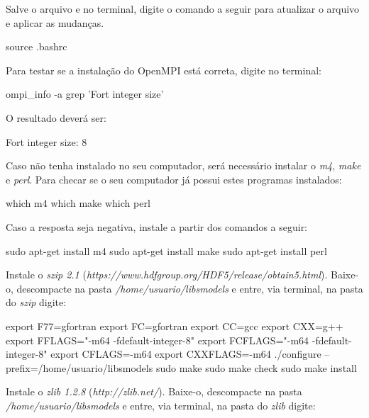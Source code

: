 \noindent Salve o arquivo e no terminal, digite o comando a seguir para atualizar o arquivo e aplicar as mudanças.
\bigskip

\begin{bashcode}
source .bashrc
\end{bashcode}
\bigskip

\noindent Para testar se a instalação do OpenMPI está correta, digite no terminal:
\bigskip

\begin{bashcode}
ompi_info -a grep 'Fort integer size'
\end{bashcode}
\bigskip

\noindent O resultado deverá ser:
\bigskip

\begin{bashcode}
Fort integer size: 8
\end{bashcode}
\bigskip

\noindent Caso não tenha instalado no seu computador, será necessário instalar o \textit{m4}, \textit{make} e \textit{perl}. Para checar se o seu computador já possui estes programas instalados:
\bigskip

\begin{bashcode}
which m4
which make
which perl
\end{bashcode}
\bigskip

\noindent Caso a resposta seja negativa, instale a partir dos comandos a seguir:
\bigskip

\begin{bashcode}
sudo apt-get install m4
sudo apt-get install make
sudo apt-get install perl
\end{bashcode}
\bigskip

\noindent Instale o \textit{szip 2.1} (\textcolor{bleu_cite}{\textit{https://www.hdfgroup.org/HDF5/release/obtain5.html}}). Baixe-o, descompacte na pasta \textit{/home/usuario/libsmodels} e entre, via terminal, na pasta do \textit{szip} digite:
\bigskip

\begin{bashcode}
export F77=gfortran
export FC=gfortran
export CC=gcc
export CXX=g++
export FFLAGS="-m64 -fdefault-integer-8"
export FCFLAGS="-m64 -fdefault-integer-8"
export CFLAGS=-m64
export CXXFLAGS=-m64
./configure --prefix=/home/usuario/libsmodels
sudo make
sudo make check
sudo make install
\end{bashcode}
\bigskip

\noindent Instale o \textit{zlib 1.2.8} (\textcolor{bleu_cite}{\textit{http://zlib.net/}}). Baixe-o, descompacte na pasta \textit{/home/usuario/libsmodels} e entre, via terminal, na pasta do \textit{zlib} digite:
\bigskip

